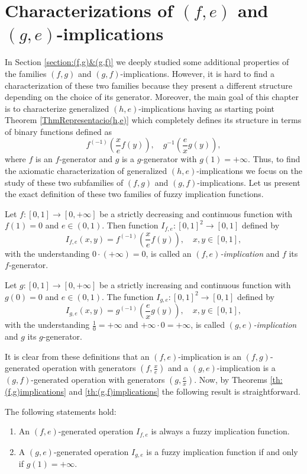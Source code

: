 \section{Characterizations of $(f,e)$ and $(g,e)$-implications}\label{section:characterizations(f,e)&(g,e)}

In Section \ref{section:(f,g)&(g,f)} we deeply studied some additional properties of the families $(f,g)$ and $(g,f)$-implications. However, it is hard to find a characterization of these two families because they present a different structure depending on the choice of its generator. Moreover, the main goal of this chapter is to characterize generalized $(h,e)$-implications having as starting point Theorem \ref{ThmRepresentacio(h,e)} which completely defines its structure in terms of binary functions defined as
$$f^{(-1)}\left( \frac{x}{e}f(y)\right), \quad g^{-1}\left( \frac{e}{x}g(y)\right),$$
where $f$ is an $f$-generator and $g$ is a $g$-generator with $g(1)=+\infty$. Thus, to find the axiomatic characterization of generalized $(h,e)$-implications we focus on the study of these two subfamilies of $(f,g)$ and $(g,f)$-implications. Let us present the exact definition of these two families of fuzzy implication functions.
\begin{definition} Let $f:[0,1] \to [0,+\infty]$ be a strictly decreasing and continuous function with $f(1)=0$ and $e \in (0,1)$. Then function $I_{f,e}:[0,1]^2 \to [0,1]$ defined by $$I_{f,e}(x,y)=f^{(-1)}\left(\frac{x}{e} f(y)\right), \quad x,y \in [0,1],$$
	with the understanding $0 \cdot (+ \infty) =0$, is called an \emph{$(f,e)$-implication} and $f$ its $f$-generator.
\end{definition}
\begin{definition} Let $g:[0,1] \to [0,+\infty]$ be a strictly increasing and continuous function with $g(0)=0$ and $e \in (0,1)$. The function $I_{g,e}:[0,1]^2 \to [0,1]$ defined by
	$$I_{g,e}(x,y)=g^{(-1)}\left(\frac{e}{x} g(y) \right), \quad x,y \in [0,1],$$
	with the understanding $\frac{1}{0} = + \infty$ and $+\infty \cdot 0 = + \infty$, is called \emph{$(g,e)$-implication} and $g$ its $g$-generator.
\end{definition}
It is clear from these definitions that an $(f,e)$-implication is an $(f,g)$-generated operation with generators $(f, \frac{x}{e})$ and a $(g,e)$-implication is a $(g,f)$-generated operation with generators $(g,\frac{e}{x})$. Now, by Theorems  \ref{th:(f,g)implications} and \ref{th:(g,f)implications} the following result is straightforward.
\begin{corollary} The following statements hold:
	\begin{enumerate}[label=(\roman*)]
		\item An $(f,e)$-generated operation $I_{f,e}$ is always a fuzzy implication function.
		\item A $(g,e)$-generated operation $I_{g,e}$ is a fuzzy implication function if and only if $g(1)=+\infty$.
	\end{enumerate}
\end{corollary}
